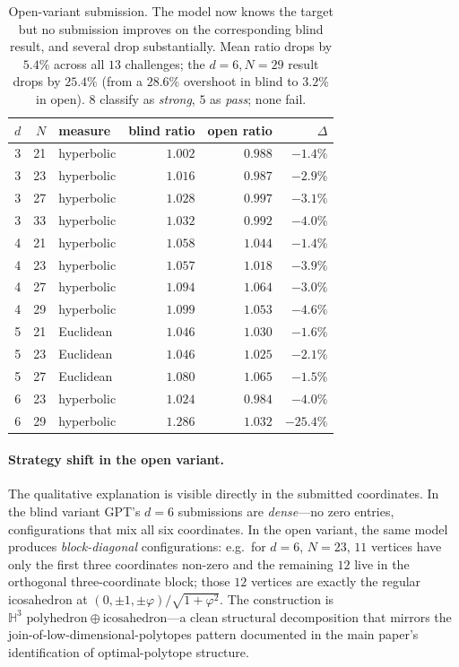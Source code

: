 \documentclass[11pt]{article}
\begin{document}
\begin{table}[ht]
\centering
\caption{Open-variant submission.  The model now knows the target
but no submission improves on the corresponding blind result, and
several drop substantially.  Mean ratio drops by $5.4\%$
across all $13$ challenges; the $d = 6, N = 29$ result drops by
$25.4\%$ (from a $28.6\%$ overshoot in blind to $3.2\%$ in open).
$8$ classify as \emph{strong}, $5$ as \emph{pass}; none fail.}
\label{tab:gpt-open-record-stress}
\smallskip
\begin{tabular}{r r l r r r}
\toprule
$d$ & $N$ & measure & blind ratio & open ratio & $\Delta$ \\
\midrule
3 & 21 & hyperbolic & $1.002$ & $0.988$ & $-1.4\%$ \\
3 & 23 & hyperbolic & $1.016$ & $0.987$ & $-2.9\%$ \\
3 & 27 & hyperbolic & $1.028$ & $0.997$ & $-3.1\%$ \\
3 & 33 & hyperbolic & $1.032$ & $0.992$ & $-4.0\%$ \\
4 & 21 & hyperbolic & $1.058$ & $1.044$ & $-1.4\%$ \\
4 & 23 & hyperbolic & $1.057$ & $1.018$ & $-3.9\%$ \\
4 & 27 & hyperbolic & $1.094$ & $1.064$ & $-3.0\%$ \\
4 & 29 & hyperbolic & $1.099$ & $1.053$ & $-4.6\%$ \\
5 & 21 & Euclidean  & $1.046$ & $1.030$ & $-1.6\%$ \\
5 & 23 & Euclidean  & $1.046$ & $1.025$ & $-2.1\%$ \\
5 & 27 & Euclidean  & $1.080$ & $1.065$ & $-1.5\%$ \\
6 & 23 & hyperbolic & $1.024$ & $0.984$ & $-4.0\%$ \\
6 & 29 & hyperbolic & $\mathbf{1.286}$ & $\mathbf{1.032}$ & $\mathbf{-25.4\%}$ \\
\bottomrule
\end{tabular}
\end{table}

\paragraph{Strategy shift in the open variant.}
The qualitative explanation is visible directly in the submitted
coordinates.  In the blind variant GPT's $d = 6$ submissions are
\emph{dense}---no zero entries, configurations that mix all six
coordinates.  In the open variant, the same model produces
\emph{block-diagonal} configurations: e.g.\ for $d = 6$, $N = 23$,
$11$ vertices have only the first three coordinates non-zero and
the remaining $12$ live in the orthogonal three-coordinate block;
those $12$ vertices are exactly the regular icosahedron at
$(0, \pm 1, \pm \varphi)/\sqrt{1+\varphi^2}$.  The construction is
$\mathbb{H}^3 \text{ polyhedron} \oplus \text{icosahedron}$---a
clean structural decomposition that mirrors the
join-of-low-dimensional-polytopes pattern documented in the main
paper's identification of optimal-polytope structure.
\end{document}
